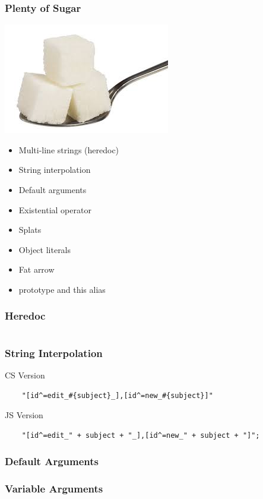 \documentclass{beamer}
\begin{document}

\begin{frame}
  \frametitle{Plenty of Sugar}
  \includegraphics[scale=.40]{sugar}
%
%
  \begin{itemize}
    \item Multi-line strings (heredoc)
    \item String interpolation
    \item Default arguments
    \item Existential operator
    \item Splats
    \item Object literals
    \item Fat arrow
    \item prototype and this alias
  \end{itemize}
\end{frame}

\begin{frame}
  \frametitle{Heredoc}
  \inputminted{coffeescript}{src/heredoc.coffee}
\end{frame}

\begin{frame}[fragile]
  \frametitle{String Interpolation}
  CS Version
  \begin{verbatim}
    "[id^=edit_#{subject}_],[id^=new_#{subject}]"
  \end{verbatim}
  JS Version
  \begin{verbatim}
    "[id^=edit_" + subject + "_],[id^=new_" + subject + "]";
  \end{verbatim}  
\end{frame}

\begin{frame}
  \frametitle{Default Arguments}
  
\end{frame}

\begin{frame}
\frametitle{Variable Arguments}

\end{frame}
\end{document}

